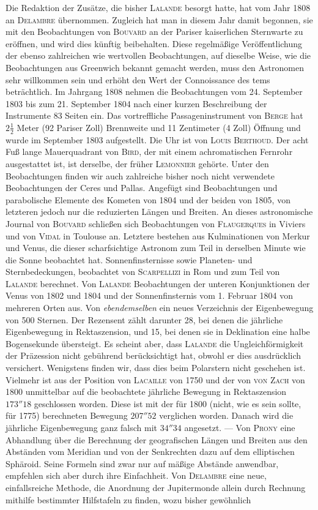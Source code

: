 Die Redaktion der Zusätze, die bisher \textsc{Lalande} besorgt hatte, hat vom Jahr 1808 an \textsc{Delambre} übernommen. Zugleich hat man in diesem Jahr damit begonnen, sie mit den Beobachtungen von \textsc{Bouvard} an der Pariser kaiserlichen Sternwarte zu eröffnen, und wird dies künftig beibehalten. Diese regelmäßige Veröffentlichung der ebenso zahlreichen wie wertvollen Beobachtungen, auf dieselbe Weise, wie die Beobachtungen aus Greenwich bekannt gemacht werden, muss den Astronomen sehr willkommen sein und erhöht den Wert der Connoissance des tems beträchtlich. Im Jahrgang 1808 nehmen die Beobachtungen vom 24. September 1803 bis zum 21. September 1804 nach einer kurzen Beschreibung der Instrumente 83 Seiten ein. Das vortreffliche Passageninstrument von \textsc{Berge} hat $2\frac{1}{2}$ Meter (92 Pariser Zoll) Brennweite und 11 Zentimeter (4 Zoll) Öffnung und wurde im September 1803 aufgestellt. Die Uhr ist von \textsc{Louis Berthoud}. Der acht Fuß lange Mauerquadrant von \textsc{Bird}, der mit einem achromatischen Fernrohr ausgestattet ist, ist derselbe, der früher \textsc{Lemonnier} gehörte. Unter den Beobachtungen finden wir auch zahlreiche bisher noch nicht verwendete Beobachtungen der Ceres und Pallas. Angefügt sind Beobachtungen und parabolische Elemente des Kometen von 1804 und der beiden von 1805, von letzteren jedoch nur die reduzierten Längen und Breiten. An dieses astronomische Journal von \textsc{Bouvard} schließen sich Beobachtungen von \textsc{Flaugerques} in Viviers und von \textsc{Vidal} in Toulouse an. Letztere bestehen aus Kulminationen von Merkur und Venus, die dieser scharfsichtige Astronom zum Teil in derselben Minute wie die Sonne beobachtet hat. Sonnenfinsternisse sowie Planeten- und Sternbedeckungen, beobachtet von \textsc{Scarpellizi} in Rom und zum Teil von \textsc{Lalande} berechnet. Von \textsc{Lalande} Beobachtungen der unteren Konjunktionen der Venus von 1802 und 1804 und der Sonnenfinsternis vom 1. Februar 1804 von mehreren Orten aus. Von \emph{ebendemselben} ein neues Verzeichnis der Eigenbewegung von 500 Sternen. Der Rezensent zählt darunter 28, bei denen die jährliche Eigenbewegung in Rektaszension, und 15, bei denen sie in Deklination eine halbe Bogensekunde übersteigt. Es scheint aber, dass \textsc{Lalande} die Ungleichförmigkeit der Präzession nicht gebührend berücksichtigt hat, obwohl er dies ausdrücklich versichert. Wenigstens finden wir, dass dies beim Polarstern nicht geschehen ist. Vielmehr ist aus der Position von \textsc{Lacaille} von 1750 und der von \textsc{von Zach} von 1800 unmittelbar auf die beobachtete jährliche Bewegung in Rektaszension $173''18$ geschlossen worden. Diese ist mit der für 1800 (nicht, wie es sein sollte, für 1775) berechneten Bewegung $207''52$ verglichen worden. Danach wird die jährliche Eigenbewegung ganz falsch mit $34''34$ angesetzt. --- Von \textsc{Prony} eine Abhandlung über die Berechnung der geografischen Längen und Breiten aus den Abständen vom Meridian und von der Senkrechten dazu auf dem elliptischen Sphäroid. Seine Formeln sind zwar nur auf mäßige Abstände anwendbar, empfehlen sich aber durch ihre Einfachheit. Von \textsc{Delambre} eine neue, einfallsreiche Methode, die Anordnung der Jupitermonde allein durch Rechnung mithilfe bestimmter Hilfstafeln zu finden, wozu bisher gewöhnlich 